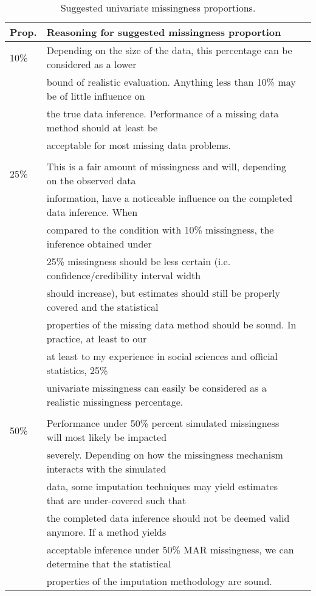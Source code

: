 \documentclass[bimj,fleqn]{w-art}
\theoremstyle{plain}
\theoremstyle{definition}
\begin{document}
\begin{table}[htb]
\begin{center}
\caption{Suggested univariate missingness proportions.}
\begin{tabular}{lll}
\hline
Prop. & Reasoning for suggested missingness proportion \\
\hline  
10\%  & Depending on the size of the data, this percentage can be considered as a lower \\
      & bound of realistic evaluation. Anything less than 10\% may be of little influence on \\
      & the true data inference. Performance of a missing data method should at least be \\
      & acceptable for most missing data problems. \\ & \\
25\%  & This is a fair amount of missingness and will, depending on the observed data \\
      & information, have a noticeable influence on the completed data inference. When \\
      & compared to the condition with 10\% missingness, the inference obtained under \\
      & 25\% missingness should be less certain (i.e. confidence/credibility interval width \\
      & should increase), but estimates should still be properly covered and the statistical \\
      & properties of the missing data method should be sound. In practice, at least to our \\
      & at least to my experience in social sciences and official statistics, 25\% \\
      & univariate missingness can easily be considered as a realistic missingness percentage. \\ & \\
50\%  & Performance under 50\% percent simulated missingness will most likely be impacted \\ 
      & severely. Depending on how the missingness mechanism interacts with the simulated \\
      & data, some imputation techniques may yield estimates that are under-covered such that \\
      & the completed data inference should not be deemed valid anymore. If a method yields \\
      & acceptable inference under 50\% MAR missingness, we can determine that the statistical \\
      & properties of the imputation methodology are sound. \\
\hline
\end{tabular}
\end{center}
\end{table}
\end{document}
